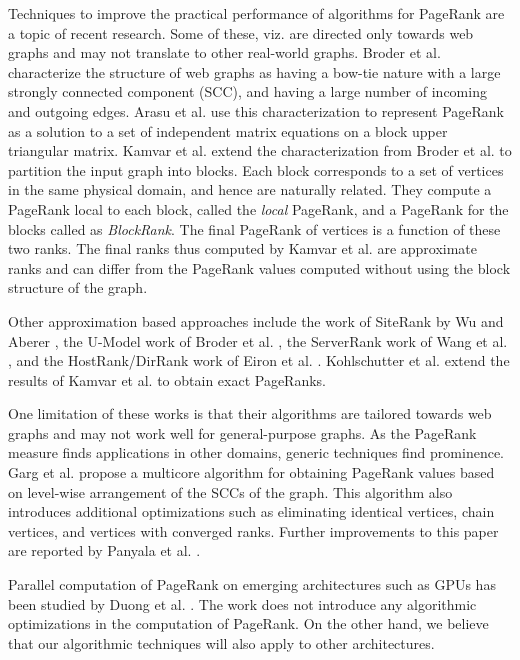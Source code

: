 Techniques to improve the practical performance of algorithms for PageRank are a topic of recent research. Some of these, viz. \cite{pr-arasu02,pr-block03,pr-duong12} are directed only towards web graphs and may not translate to other real-world graphs. Broder et al. \cite{broder00} characterize the structure of web graphs as having a bow-tie nature with a large strongly connected component (SCC), and having a large number of incoming and outgoing edges. Arasu et al. \cite{pr-arasu02} use this characterization to represent PageRank as a solution to a set of independent matrix equations on a block upper triangular matrix. Kamvar et al. \cite{pr-block03} extend the characterization from Broder et al. \cite{broder00} to partition the input graph into blocks. Each block corresponds to a set of vertices in the same physical domain, and hence are naturally related. They compute a PageRank local to each block, called the {\em local} PageRank, and a PageRank for the blocks called as {\em BlockRank}. The final PageRank of vertices is a function of these two ranks. The final ranks thus computed by Kamvar et al. \cite{pr-block03} are approximate ranks and can differ from the PageRank values computed without using the block structure of the graph.

Other approximation based approaches include the work of SiteRank by Wu and Aberer \cite{wu}, the U-Model work of Broder et al. \cite{broder}, the ServerRank work of Wang et al. \cite{wang}, and the HostRank/DirRank work of Eiron et al. \cite{eiron}. Kohlschutter et al. \cite{kohlschutter} extend the results of Kamvar et al. \cite{pr-block03} to obtain exact PageRanks. 

One limitation of these works \cite{pr-block03,eiron,kohlschutter,wang,wu} is that their algorithms are tailored towards web graphs and may not work well for general-purpose graphs. As the PageRank measure finds applications in other domains, generic techniques find prominence. Garg et al. \cite{pr-sticd16} propose a multicore algorithm for obtaining PageRank values based on level-wise arrangement of the SCCs of the graph. This algorithm also introduces additional optimizations such as eliminating identical vertices, chain vertices, and vertices with converged ranks. Further improvements to this paper are reported by Panyala et al. \cite{hipc17}.

Parallel computation of PageRank on emerging architectures such as GPUs has been studied by Duong et al. \cite{pr-duong12}. The work does not introduce any algorithmic optimizations in the computation of PageRank. On the other hand, we believe that our algorithmic techniques will also apply to other architectures.

